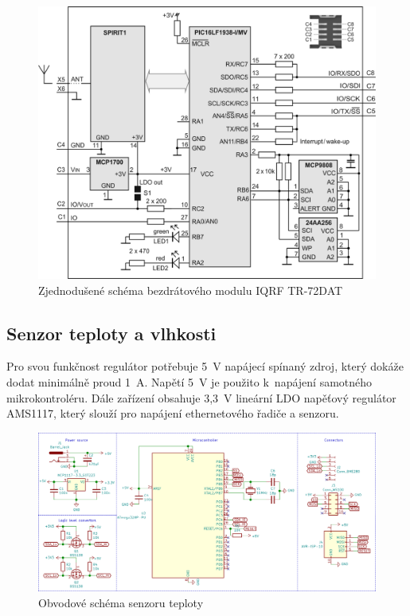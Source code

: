 \documentclass[12pt,a4paper]{article}
\begin{document}
\begin{figure}[H]
\centering
\label{fig:iqrf/zjednodusene-schema}
\includegraphics[width = 128mm]{../img/iqrf/dctr-72dat-zjednodusene-schema.png}
\caption{Zjednodušené schéma bezdrátového modulu IQRF TR-72DAT}
\end{figure}

\newpage

\subsection{Senzor teploty a vlhkosti}

Pro svou funkčnost regulátor potřebuje 5~V napájecí spínaný zdroj, který dokáže dodat minimálně proud 1~A. Napětí 5~V je použito k~napájení samotného mikrokontroléru. Dále zařízení obsahuje 3,3~V lineární LDO napěťový regulátor AMS1117, který slouží pro napájení ethernetového řadiče a senzoru.

\begin{figure}[H]
\centering
\label{fig:schematic/sensor}
\includegraphics[width = 150mm]{../img/kicad/sensor-schema.png}
\caption{Obvodové schéma senzoru teploty}
\end{figure}
\end{document}
